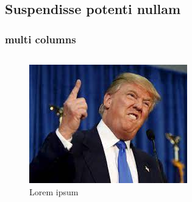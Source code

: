 \subsection{Suspendisse potenti nullam}
\begin{frame}
\frametitle{multi columns}

\begin{columns}[c]

\begin{column}{.25\textwidth}
\begin{figure}
    \centering
    \includegraphics[width=\textwidth]{figures/trumpy.jpeg}
    \caption{Lorem ipsum}
\end{figure}
\end{column}


\begin{column}{.25\textwidth}
\end{column}



\end{columns}
\end{frame}

